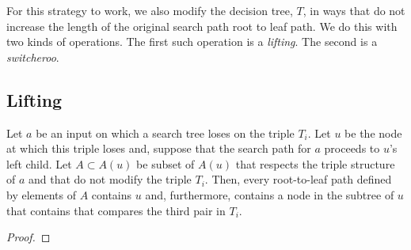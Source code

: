 \documentclass{patmorin}
\begin{document}
For this strategy to work, we also modify the decision tree, $T$, in
ways that do not increase the length of the original search path root
to leaf path.  We do this with two kinds of operations.  The first such
operation is a \emph{lifting}.  The second is a \emph{switcheroo}.

\subsection{Lifting}

Let $a$ be an input on which a search tree loses on the triple $T_i$.
Let $u$ be the node at which this triple loses and, suppose that the
search path for $a$ proceeds to $u$'s left child.  Let $A\subset A(u)$
be subset of $A(u)$ that respects the triple structure of $a$ and
 that do not modify the triple $T_i$.  Then, every root-to-leaf path
 defined by elements of $A$ contains $u$ and, furthermore, contains a
 node in the subtree of $u$ that contains that compares the third pair
 in $T_i$.
\begin{proof}

\end{proof}
\end{document}
